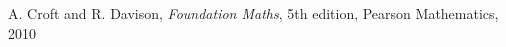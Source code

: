 \begin{thebibliography}{9}

 A. Croft and R. Davison, \textit{Foundation Maths}, 5th edition, Pearson Mathematics, 2010

\end{thebibliography}